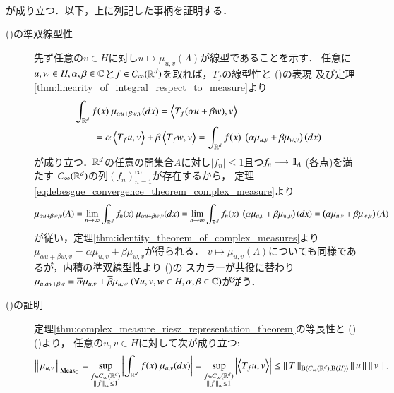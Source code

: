 \begin{prf}
\begin{description}
\begin{align}
				\end{align}
				が成り立つ．以下，上に列記した事柄を証明する．
				\begin{description}
					\item[()の準双線型性]
						先ず任意の$v \in H$に対し$u \longmapsto \mu_{u,v}(\Lambda)$が線型であることを示す．
						任意に$u,w \in H,\alpha,\beta \in \mathbb{C}$と$f \in C_\infty (\mathbb{R}^d)$を取れば，$T_f$の線型性と
						()の表現
						及び定理\ref{thm:linearity_of_integral_respect_to_measure}より
						\begin{align}
							&\int_{\R^d} f(x)\ \mu_{\alpha u + \beta w,v}(dx)
							= \inprod<T_f (\alpha u + \beta w),v> \\
							&\qquad = \alpha \inprod<T_f u,v> + \beta \inprod<T_f w,v>
							= \int_{\R^d} f(x)\ \left( \alpha \mu_{u,v} + \beta \mu_{w,v} \right)(dx)
							\label{eq:thm_spectral_decomposition_of_bounded_linear_operators_4}
						\end{align}
						が成り立つ．$\mathbb{R}^d$の任意の開集合$A$に対し$|f_n| \leq 1$且つ$f_n \longrightarrow \defunc_A\ $(各点)を満たす
						$C_\infty (\mathbb{R}^d)$の列$(f_n)_{n=1}^{\infty}$が存在するから，
						定理\ref{eq:lebesgue_convergence_theorem_complex_measure}より
						\begin{align}
							\mu_{\alpha u + \beta w,v}(A)
							= \lim_{n \to \infty} \int_{\R^d} f_n(x)\ \mu_{\alpha u + \beta w,v}(dx)
							= \lim_{n \to \infty} \int_{\R^d} f_n(x)\ \left( \alpha \mu_{u,v} + \beta \mu_{w,v} \right)(dx)
							= \left( \alpha \mu_{u,v} + \beta \mu_{w,v} \right)(A)
						\end{align}
						が従い，定理\ref{thm:identity_theorem_of_complex_measures}より
						$\mu_{\alpha u + \beta w,v} = \alpha \mu_{u,v} + \beta \mu_{w,v}$が得られる．
						$v \longmapsto \mu_{u,v}(\Lambda)$についても同様であるが，内積の準双線型性より
						()の
						スカラーが共役に替わり
						$\mu_{u,\alpha v + \beta w} = \overline{\alpha} \mu_{u,v} + \overline{\beta} \mu_{u,w}\ (\forall u,v,w \in H,\alpha,\beta \in \mathbb{C})$が従う．
						
					\item[()の証明]
						定理\ref{thm:complex_measure_riesz_representation_theorem}の等長性と
						()
						()より，
						任意の$u,v \in H$に対して次が成り立つ:
						\begin{align}
							\Norm{\mu_{u,v}}{\CM} 
							= \sup{\substack{f \in \cvan{\R^d} \\ \Norm{f}{\infty} \leq 1}}{\left| \int_{\R^d} f(x)\ \mu_{u,v}(dx) \right|}
							= \sup{\substack{f \in \cvan{\R^d} \\ \Norm{f}{\infty} \leq 1}}{\left| \inprod<T_f u,v> \right|}
							\leq \Norm{T}{\Bop{\cvan{\R^d}}{\selfBop{H} } } \Norm{u}{} \Norm{v}{}.
						\end{align}
						

\end{description}
\end{description}
\end{prf}
